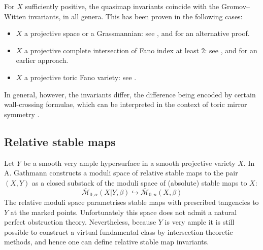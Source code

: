 \documentclass[11pt]{amsart}
\newcommand{\M}[4]{\overline{\mathcal{M}}_{#1,#2}(#3,#4)}
\newcommand{\Q}[4]{\mathcal{Q}_{#1,#2}(#3,#4)}
\newcommand{\MM}{\mathfrak M}
\newcommand{\om}[1]{\mathcal{#1}}
\theoremstyle{definition}
\theoremstyle{definition}
\begin{document}
For $X$ sufficiently positive, the quasimap invariants coincide with the Gromov--Witten invariants, in all genera. This has been proven in the following cases:
\begin{itemize}[leftmargin=0.7cm]
\item $X$ a projective space or a Grassmannian: see \cite[Theorems~ 3~and~4]{MOP}, and \cite{ManolacheStable} for an alternative proof.
\item $X$ a projective complete intersection of Fano index at least $2$: see \cite[Corollary 1.7]{CF-K-MirrorSymmetry}, and \cite{CZ-mirror} for an earlier approach.
\item $X$ a projective toric Fano variety: see \cite[Corollary 1.3]{CF-K-higher-genus}.
\end{itemize}
In general, however, the invariants differ, the difference being encoded by certain wall-crossing formulae, which can be interpreted in the context of toric mirror symmetry \cite{CF-K-wallcrossing}.


\subsection{Relative stable maps}
Let $Y$ be a smooth very ample hypersurface in a smooth projective variety $X$. In \cite{Ga} A. Gathmann constructs a moduli space of relative stable maps to the pair $(X,Y)$ as a closed substack of the moduli space of (absolute) stable maps to $X$:
\begin{equation*} \M{0}{\alpha}{X|Y}{\beta} \hookrightarrow \M{0}{n}{X}{\beta} \end{equation*}
The relative moduli space parametrises stable maps with prescribed tangencies to $Y$ at the marked points.  Unfortunately this space does not admit a natural perfect obstruction theory. Nevertheless, because $Y$ is very ample it is still possible to construct a virtual fundamental class by intersection-theoretic methods, and hence one can define relative stable map invariants.
\end{document}
